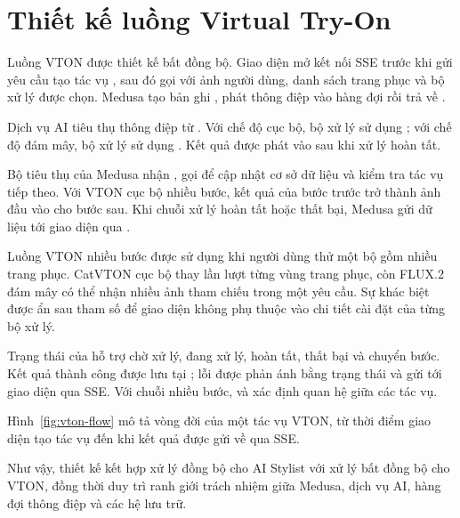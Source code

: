 \section{Thiết kế luồng Virtual Try-On}

Luồng VTON được thiết kế bất đồng bộ. Giao diện mở kết nối SSE trước khi gửi yêu cầu tạo tác vụ \cite{sse-mdn}, sau đó gọi  với ảnh người dùng, danh sách trang phục và bộ xử lý được chọn. Medusa tạo bản ghi , phát thông điệp vào hàng đợi  rồi trả về .

\medskip

Dịch vụ AI tiêu thụ thông điệp từ . Với chế độ cục bộ, bộ xử lý sử dụng ; với chế độ đám mây, bộ xử lý sử dụng . Kết quả được phát vào  sau khi xử lý hoàn tất.

\medskip

Bộ tiêu thụ của Medusa nhận , gọi  để cập nhật cơ sở dữ liệu và kiểm tra tác vụ tiếp theo. Với VTON cục bộ nhiều bước, kết quả của bước trước trở thành ảnh đầu vào cho bước sau. Khi chuỗi xử lý hoàn tất hoặc thất bại, Medusa gửi dữ liệu tới giao diện qua .

\medskip

Luồng VTON nhiều bước được sử dụng khi người dùng thử một bộ gồm nhiều trang phục. CatVTON cục bộ thay lần lượt từng vùng trang phục, còn FLUX.2 đám mây có thể nhận nhiều ảnh tham chiếu trong một yêu cầu. Sự khác biệt được ẩn sau tham số  để giao diện không phụ thuộc vào chi tiết cài đặt của từng bộ xử lý.

\medskip

Trạng thái của  hỗ trợ chờ xử lý, đang xử lý, hoàn tất, thất bại và chuyển bước. Kết quả thành công được lưu tại ; lỗi được phản ánh bằng trạng thái  và gửi tới giao diện qua SSE. Với chuỗi nhiều bước,  và  xác định quan hệ giữa các tác vụ.

\medskip

Hình~\ref{fig:vton-flow} mô tả vòng đời của một tác vụ VTON, từ thời điểm giao diện tạo tác vụ đến khi kết quả được gửi về qua SSE.



\medskip

Như vậy, thiết kế kết hợp xử lý đồng bộ cho AI Stylist với xử lý bất đồng bộ cho VTON, đồng thời duy trì ranh giới trách nhiệm giữa Medusa, dịch vụ AI, hàng đợi thông điệp và các hệ lưu trữ.

\clearpage
